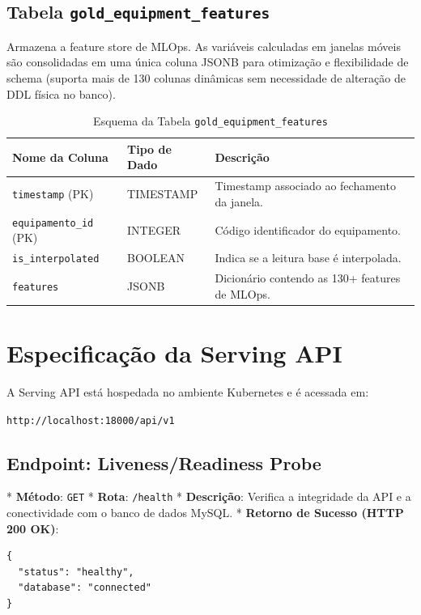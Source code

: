\documentclass[12pt,a4paper]{article}
\begin{document}
\subsection{Tabela \texttt{gold\_equipment\_features}}
Armazena a feature store de MLOps. As variáveis calculadas em janelas móveis são consolidadas em uma única coluna JSONB para otimização e flexibilidade de schema (suporta mais de 130 colunas dinâmicas sem necessidade de alteração de DDL física no banco).

\begin{table}[h]
\centering
\caption{Esquema da Tabela \texttt{gold\_equipment\_features}}
\begin{tabular}{lll}
\toprule
\textbf{Nome da Coluna} & \textbf{Tipo de Dado} & \textbf{Descrição} \\
\midrule
\texttt{timestamp} (PK) & TIMESTAMP & Timestamp associado ao fechamento da janela. \\
\texttt{equipamento\_id} (PK) & INTEGER & Código identificador do equipamento. \\
\texttt{is\_interpolated} & BOOLEAN & Indica se a leitura base é interpolada. \\
\texttt{features} & JSONB & Dicionário contendo as 130+ features de MLOps. \\
\bottomrule
\end{tabular}
\end{table}

\newpage

\section{Especificação da Serving API}

A Serving API está hospedada no ambiente Kubernetes e é acessada em:
\begin{center}
    \texttt{http://localhost:18000/api/v1}
\end{center}

\subsection{Endpoint: Liveness/Readiness Probe}
*   \textbf{Método}: \texttt{GET}
*   \textbf{Rota}: \texttt{/health}
*   \textbf{Descrição}: Verifica a integridade da API e a conectividade com o banco de dados MySQL.
*   \textbf{Retorno de Sucesso (HTTP 200 OK)}:
\begin{lstlisting}
{
  "status": "healthy",
  "database": "connected"
}
\end{lstlisting}
\end{document}
